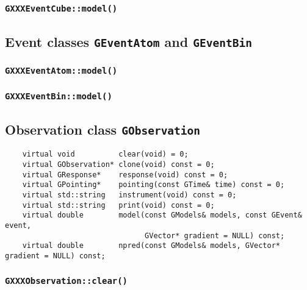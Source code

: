 \documentclass{article}[12pt,a4]
\begin{document}
\subsubsection{{\tt GXXXEventCube::model()}}

\subsection{Event classes {\tt GEventAtom} and {\tt GEventBin}}
\label{sec:GEvent}


\subsubsection{{\tt GXXXEventAtom::model()}}

\subsubsection{{\tt GXXXEventBin::model()}}


\subsection{Observation class {\tt GObservation}}
\label{sec:GObservation}

\begin{verbatim}
    virtual void          clear(void) = 0;
    virtual GObservation* clone(void) const = 0;
    virtual GResponse*    response(void) const = 0;
    virtual GPointing*    pointing(const GTime& time) const = 0;
    virtual std::string   instrument(void) const = 0;
    virtual std::string   print(void) const = 0;
    virtual double        model(const GModels& models, const GEvent& event,
                                GVector* gradient = NULL) const;
    virtual double        npred(const GModels& models, GVector* gradient = NULL) const;
\end{verbatim}

\subsubsection{{\tt GXXXObservation::clear()}}
\end{document}
